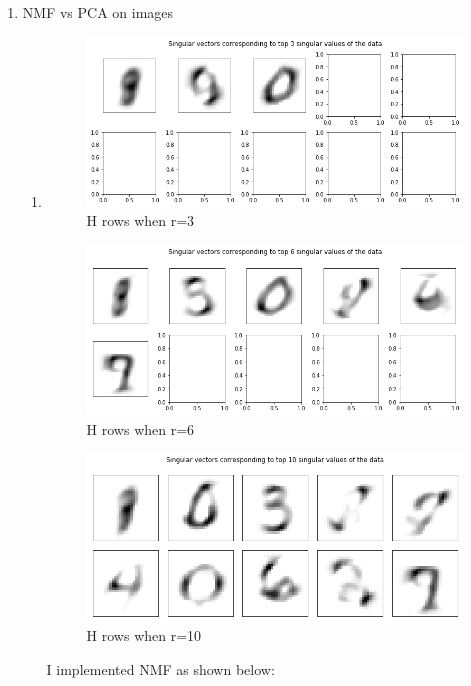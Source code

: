 \documentclass{article}
\begin{document}
\begin{enumerate}
\item NMF vs PCA on images
\begin{enumerate}
\item 
\begin{figure}[ht]
\includegraphics[width=\textwidth]{../plots/2a-1.png}
\caption{H rows when r=3}
\label{fig_r3}
\end{figure}
\begin{figure}[ht]
\includegraphics[width=\textwidth]{../plots/2a-2.png}
\caption{H rows when r=6}
\label{fig_r6}
\end{figure}
\begin{figure}[ht]
\includegraphics[width=\textwidth]{../plots/2a-3.png}
\caption{H rows when r=10}
\label{fig_r10}
\end{figure}
\pagebreak
I implemented NMF as shown below:

\end{enumerate}
\end{enumerate}
\end{document}
